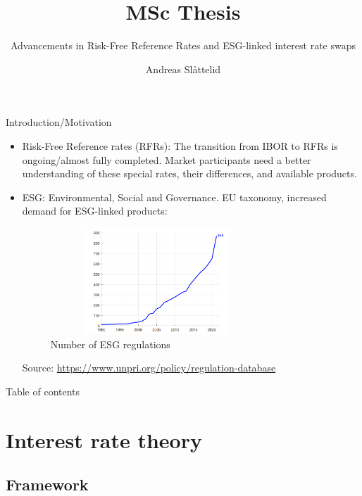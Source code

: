 \documentclass[UKenglish]{beamer}
\author{Andreas Slåttelid}
\title{MSc Thesis}
\subtitle{Advancements in Risk-Free Reference Rates and ESG-linked interest rate swaps}
\begin{document}


%
%
\begin{frame}{Introduction/Motivation}
\begin{itemize}
    \item Risk-Free Reference rates (RFRs):
    The transition from IBOR to RFRs is ongoing/almost fully completed. Market participants need a better understanding of these special rates, their differences, and available products. 
    \item ESG: Environmental, Social and Governance. EU taxonomy, increased demand for ESG-linked products: 
    \begin{figure}[htp]
    \centering
    \includegraphics[height = 4cm, width=8cm]{ESG/ESG_regulations.PNG}
    \caption{Number of ESG regulations}
\end{figure}
Source: \url{https://www.unpri.org/policy/regulation-database}
    
\end{itemize} 
\end{frame}

\begin{frame}{Table of contents}
    \tableofcontents[currentsection]
\end{frame}



\section{Interest rate theory}
\SectionPage
\subsection{Framework}
\end{document}
